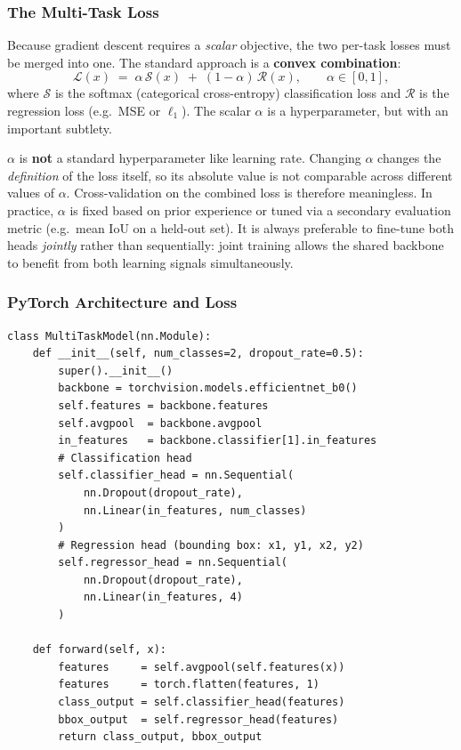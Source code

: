 \documentclass[11pt,a4paper]{article}
\newcommand{\term}[1]{\textcolor{DefGreen}{\textbf{#1}}\index{#1}}
\begin{document}
\subsubsection{The Multi-Task Loss}

Because gradient descent requires a \emph{scalar} objective, the two per-task losses must be merged into one. The standard approach is a \term{convex combination}:
\[
  \mathcal{L}(x) \;=\; \alpha\,\mathcal{S}(x) \;+\; (1-\alpha)\,\mathcal{R}(x), \qquad \alpha \in [0,1],
\]
where $\mathcal{S}$ is the softmax (categorical cross-entropy) classification loss and $\mathcal{R}$ is the regression loss (e.g.\ MSE or $\ell_1$). The scalar $\alpha$ is a hyperparameter, but with an important subtlety.

\begin{warnbox}
$\alpha$ is \textbf{not} a standard hyperparameter like learning rate. Changing $\alpha$ changes the \emph{definition} of the loss itself, so its absolute value is not comparable across different values of $\alpha$. Cross-validation on the combined loss is therefore meaningless. In practice, $\alpha$ is fixed based on prior experience or tuned via a secondary evaluation metric (e.g.\ mean IoU on a held-out set). It is always preferable to fine-tune both heads \emph{jointly} rather than sequentially: joint training allows the shared backbone to benefit from both learning signals simultaneously.
\end{warnbox}

\subsubsection{PyTorch Architecture and Loss}

\begin{lstlisting}[style=pythonstyle, caption={Multi-task model with classification and regression heads}]
class MultiTaskModel(nn.Module):
    def __init__(self, num_classes=2, dropout_rate=0.5):
        super().__init__()
        backbone = torchvision.models.efficientnet_b0()
        self.features = backbone.features
        self.avgpool  = backbone.avgpool
        in_features   = backbone.classifier[1].in_features
        # Classification head
        self.classifier_head = nn.Sequential(
            nn.Dropout(dropout_rate),
            nn.Linear(in_features, num_classes)
        )
        # Regression head (bounding box: x1, y1, x2, y2)
        self.regressor_head = nn.Sequential(
            nn.Dropout(dropout_rate),
            nn.Linear(in_features, 4)
        )

    def forward(self, x):
        features     = self.avgpool(self.features(x))
        features     = torch.flatten(features, 1)
        class_output = self.classifier_head(features)
        bbox_output  = self.regressor_head(features)
        return class_output, bbox_output
\end{lstlisting}
\end{document}
